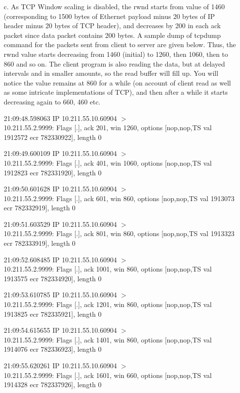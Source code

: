 \begin{multicols}{2}
\begin{itemize}
\item[c.] As TCP Window scaling is disabled, the rwnd starts from value of 1460 (corresponding to 1500 bytes of Ethernet payload minus 20 bytes of IP header minus 20 bytes of TCP header), and decreases by 200 in each ack packet since data packet contains 200 bytes. A sample dump of tcpdump command for the packets sent from client to server are given below. Thus, the rwnd value starts decreasing from 1460 (initial) to 1260, then 1060, then to 860 and so on. The client program is also reading the data, but at delayed intervals and in smaller amounts, so the read buffer will fill up. You will notice the value remains at 860 for a while (on account of client read as well as some intricate implementations of TCP), and then after a while it starts decreasing again to 660, 460 etc.

21:09:48.598063 IP 10.211.55.10.60904 $>$\\ 10.211.55.2.9999: Flags [.], ack 201, win 1260, options [nop,nop,TS val 1912572 ecr 782330922], length 0

21:09:49.600109 IP 10.211.55.10.60904 $>$\\ 10.211.55.2.9999: Flags [.], ack 401, win 1060, options [nop,nop,TS val 1912823 ecr 782331920], length 0

21:09:50.601628 IP 10.211.55.10.60904 $>$\\ 10.211.55.2.9999: Flags [.], ack 601, win 860, options [nop,nop,TS val 1913073 ecr 782332919], length 0

21:09:51.603529 IP 10.211.55.10.60904 $>$\\ 10.211.55.2.9999: Flags [.], ack 801, win 860, options [nop,nop,TS val 1913323 ecr 782333919], length 0

21:09:52.608485 IP 10.211.55.10.60904 $>$\\ 10.211.55.2.9999: Flags [.], ack 1001, win 860, options [nop,nop,TS val 1913575 ecr 782334920], length 0

21:09:53.610785 IP 10.211.55.10.60904 $>$\\ 10.211.55.2.9999: Flags [.], ack 1201, win 860, options [nop,nop,TS val 1913825 ecr 782335921], length 0

21:09:54.615655 IP 10.211.55.10.60904 $>$\\ 10.211.55.2.9999: Flags [.], ack 1401, win 860, options [nop,nop,TS val 1914076 ecr 782336923], length 0

21:09:55.620261 IP 10.211.55.10.60904 $>$\\ 10.211.55.2.9999: Flags [.], ack 1601, win 660, options [nop,nop,TS val 1914328 ecr 782337926], length 0


\end{itemize}
\end{multicols}
